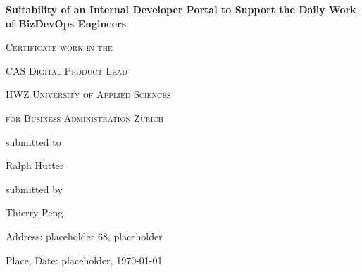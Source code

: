 \documentclass[a4paper,12pt]{article}
\begin{document}
    \begin{titlepage}
        \begin{center}
        {\huge\bfseries Suitability of an Internal Developer Portal to Support the Daily Work of BizDevOps Engineers\par}
            \vspace{2cm}

            {\scshape\large Certificate work in the \par}
            {\scshape\large CAS Digital Product Lead \par}
            \vspace{1cm}

            {\scshape\large HWZ University of Applied Sciences \par}
            {\scshape\large for Business Administration Zurich \par}
            \vspace{4cm}

            {\normalsize submitted to\par}
            \vspace{0.5cm}

            {\large Ralph Hutter\par}
            \vfill
            {\normalsize submitted by\par}
            \vspace{0.5cm}
            {\large Thierry Peng\par}
            \vspace{0.5cm}
            {\normalsize Address: placeholder 68, placeholder\par}
            {\normalsize  Place, Date: placeholder, \today\par}

        \end{center}
    \end{titlepage}
\end{document}
